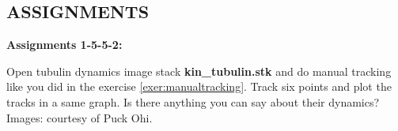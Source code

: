 \subsection{ASSIGNMENTS}

{\sffamily\bfseries
Assignments 1-5-5-2: }

Open tubulin dynamics image stack \textbf{kin\_tubulin.stk} and do manual tracking like you did in the exercise \ref{exer:manualtracking}. Track six
points and plot the tracks in a same graph. Is there anything you can
say about their dynamics?\\ 

Images: courtesy of Puck Ohi.